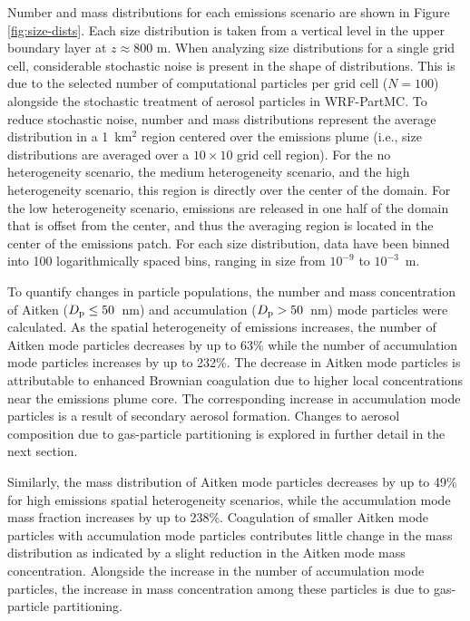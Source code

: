 \documentclass[acp, manuscript]{copernicus}
\begin{document}
Number and mass distributions for each emissions scenario are shown in
Figure \ref{fig:size-dists}. Each size distribution is taken from a
vertical level in the upper boundary layer at $z\approx800$ m. When
analyzing size distributions for a single grid cell, considerable
stochastic noise is present in the shape of distributions. This is due
to the selected number of computational particles per grid cell ($N =
100$) alongside the stochastic treatment of aerosol particles in
WRF-PartMC. To reduce stochastic noise, number and mass distributions
represent the average distribution in a 1~km$^2$ region centered over
the emissions plume (i.e., size distributions are averaged over a
$10\times10$ grid cell region). For the no heterogeneity scenario, the medium heterogeneity scenario,
and the high heterogeneity scenario, this region is directly over the center of the
domain. For the low heterogeneity scenario, emissions are released in one half of the
domain that is offset from the center, and thus the averaging region
is located in the center of the emissions patch. For each size
distribution, data have been binned into 100 logarithmically spaced
bins, ranging in size from $10^{-9}$ to $10^{-3}$~m.

To quantify changes in particle populations, the number and mass
concentration of Aitken ($D_{\rm p} \leq 50$~nm) and accumulation
($D_{\rm p} > 50$~nm) mode particles were calculated. As the spatial
heterogeneity of emissions increases, the number of Aitken mode
particles decreases by up to 63\% while the number of accumulation
mode particles increases by up to 232\%. The decrease in Aitken mode
particles is attributable to enhanced Brownian coagulation due to
higher local concentrations near the emissions plume core. The
corresponding increase in accumulation mode particles is a result of
secondary aerosol formation.  Changes to aerosol composition due to
gas-particle partitioning is explored in further detail in the next
section.

Similarly, the mass distribution of Aitken mode particles decreases by
up to 49\% for high emissions spatial heterogeneity scenarios, while
the accumulation mode mass fraction increases by up to
238\%. Coagulation of smaller Aitken mode particles with accumulation
mode particles contributes little change in the mass distribution as
indicated by a slight reduction in the Aitken mode mass
concentration. Alongside the increase in the number of accumulation mode 
particles, the increase in mass concentration among these particles is due 
to gas-particle partitioning. 
\end{document}
